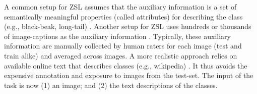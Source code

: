 \documentclass[11pt,a4paper]{article}
\newcommand\gal[1]{\textcolor{bright}{\textbf{GAL:} #1 }}
\newcommand\tzuf[1]{\textcolor{blue}{\textbf{TZUF:} #1 }}
\begin{document}


A common setup for ZSL assumes that the auxiliary information is a set of semantically meaningful properties (called attributes) for describing the class (e.g., black-beak, long-tail) \citep{wah2011caltech,farhadi2009describing,lampert2009learning,changpinyo2020classifier,atzmon2018probabilistic}. Another setup for ZSL uses hundreds or thousands of image-captions as the auxiliary information \citep{reed2016learning,Felix_2018_ECCV, Xian_2018_CVPR,Sariyildiz_2019_CVPR}. Typically, these auxiliary information are  manually collected by human raters for each image (test and train alike) and averaged across images.
A more realistic approach 
relies on available online text that describes classes (e.g., wikipedia) \cite{elhoseiny2017link}. It thus avoids the expensive annotation and exposure to images from the test-set. The input of the task is now (1) an image; and (2) the text descriptions of the classes. 

\end{document}

